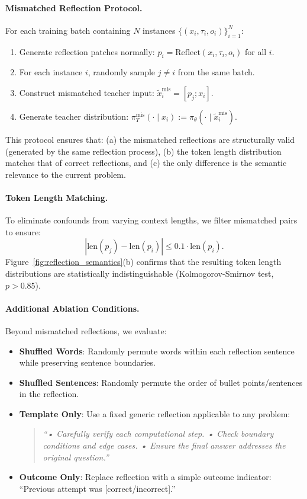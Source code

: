 \documentclass{article}
\theoremstyle{plain}
\theoremstyle{definition}
\theoremstyle{remark}
\begin{document}
\paragraph{Mismatched Reflection Protocol.}
For each training batch containing $N$ instances $\{(x_i, \tau_i, o_i)\}_{i=1}^N$:
\begin{enumerate}
    \item Generate reflection patches normally: $p_i = \mathrm{Reflect}(x_i, \tau_i, o_i)$ for all $i$.
    \item For each instance $i$, randomly sample $j \neq i$ from the same batch.
    \item Construct mismatched teacher input: $\tilde{x}_i^{\text{mis}} = [p_j; x_i]$.
    \item Generate teacher distribution: $\pi_T^{\text{mis}}(\cdot \mid x_i) := \pi_\theta(\cdot \mid \tilde{x}_i^{\text{mis}})$.
\end{enumerate}
This protocol ensures that: (a) the mismatched reflections are structurally valid (generated by the same reflection process), (b) the token length distribution matches that of correct reflections, and (c) the only difference is the semantic relevance to the current problem.

\paragraph{Token Length Matching.}
To eliminate confounds from varying context lengths, we filter mismatched pairs to ensure:
\begin{equation}
\left| \text{len}(p_j) - \text{len}(p_i) \right| \leq 0.1 \cdot \text{len}(p_i).
\end{equation}
Figure~\ref{fig:reflection_semantics}(b) confirms that the resulting token length distributions are statistically indistinguishable (Kolmogorov-Smirnov test, $p > 0.85$).

\paragraph{Additional Ablation Conditions.}
Beyond mismatched reflections, we evaluate:
\begin{itemize}
    \item \textbf{Shuffled Words}: Randomly permute words within each reflection sentence while preserving sentence boundaries.
    \item \textbf{Shuffled Sentences}: Randomly permute the order of bullet points/sentences in the reflection.
    \item \textbf{Template Only}: Use a fixed generic reflection applicable to any problem:
    \begin{quote}
    \textit{``• Carefully verify each computational step. • Check boundary conditions and edge cases. • Ensure the final answer addresses the original question.''}
    \end{quote}
    \item \textbf{Outcome Only}: Replace reflection with a simple outcome indicator: ``Previous attempt was [correct/incorrect].''
\end{itemize}
\end{document}
